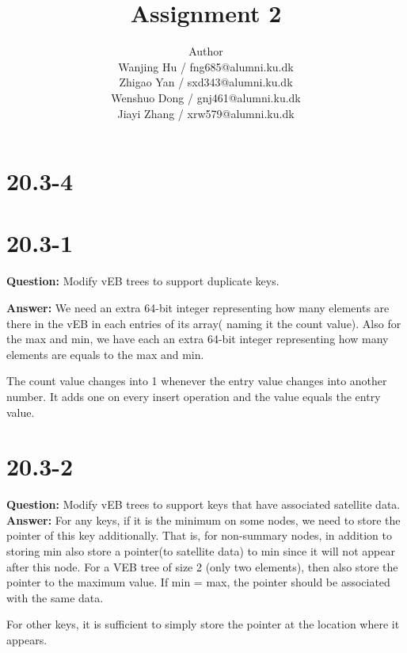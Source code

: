 \documentclass[12pt]{article}
\title{Assignment 2}
\author{Author \\
  Wanjing Hu / fng685@alumni.ku.dk  \\
  Zhigao Yan / sxd343@alumni.ku.dk  \\
  Wenshuo Dong / gnj461@alumni.ku.dk  \\
  Jiayi Zhang / xrw579@alumni.ku.dk \\
}
\begin{document}
\maketitle

\section{20.3-4}

\section{20.3-1}
\textbf{Question: } 
Modify vEB trees to support duplicate keys.

\textbf{Answer:}
We need an extra 64-bit integer representing how many elements are there in the vEB in each entries of its array( naming it the count value). Also for the max and min, we have each an extra  64-bit integer representing how many elements are equals to the max and min. 

The count value changes into 1 whenever the entry value changes into another number. It adds one on every insert operation and the value equals the entry value.

\section{20.3-2}
\textbf{Question:} Modify vEB trees to support keys that have associated satellite data.\\
\textbf{Answer:} For any keys, if it is the minimum on some nodes, we need to store the pointer of this key additionally. That is, for non-summary nodes, in addition to storing min also store a pointer(to satellite data) to min since it will not appear after this node.
For a VEB tree of size 2 (only two elements), then also store the pointer to the maximum value. If min = max, the pointer should be associated with the same data. 


For other keys, it is sufficient to simply store the pointer at the location where it appears.
\end{document}
